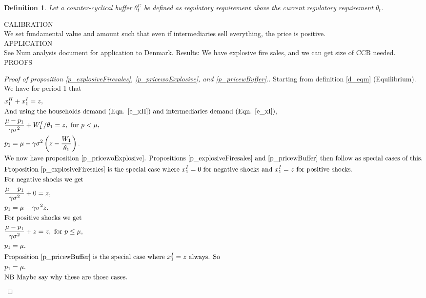 \documentclass[11pt]{article}
\newtheorem{definition}{Definition}%
\begin{document}
\begin{appendices}
\begin{definition}
Let a counter-cyclical buffer $\theta^C_t$ be defined as regulatory requirement above the current regulatory requirement $\theta_t$.
\end{definition}

\newpage

CALIBRATION\\
We set fundamental value and amount such that even if intermediaries sell everything, the price is positive.\\


APPLICATION\\
See Num analysis document for application to Denmark. Results: We have explosive fire sales, and we can get size of CCB needed.\\



PROOFS
\begin{proof}[Proof of proposition \ref{p_explosiveFiresales}, \ref{p_pricewoExplosive}, and \ref{p_pricewBuffer}.]
Starting from definition \ref{d_eqm} (Equilibrium). We have for period 1 that
\begin{align*}
&x^H_1 + x^I_1 = z,\\
&\text{And using the households demand (Eqn. \ref{e_xH}) and intermediaries demand (Eqn. \ref{e_xI}),}\\
&\frac{\mu - p_1}{\gamma\sigma^2} + W^I_1/\theta_1 = z, \text{ for $p<\mu$},\\
&p_1 = \mu - \gamma \sigma^2 \left(z - \frac{W_1}{\theta_1}\right).\\
&\text{We now have proposition \ref{p_pricewoExplosive}. Propositions \ref{p_explosiveFiresales} and \ref{p_pricewBuffer} then follow as special cases of this.}\\
&\text{Proposition \ref{p_explosiveFiresales} is the special case where $x^I_1 = 0$ for negative shocks and $x^I_1 = z$ for positive shocks.}\\
&\text{For negative shocks we get}\\
&\frac{\mu - p_1}{\gamma\sigma^2} + 0 = z,\\
&p_1 = \mu - \gamma\sigma^2 z.\\
&\text{For positive shocks we get}\\
&\frac{\mu - p_1}{\gamma\sigma^2} + z = z, \text{ for $p\leq\mu$},\\
&p_1 = \mu.\\
&\text{Proposition \ref{p_pricewBuffer} is the special case where $x^I_1 = z$ always. So}\\
&p_1 = \mu.\\
&\text{NB Maybe say why these are those cases.}\\
\end{align*}
\end{proof}


\end{appendices}
\end{document}
